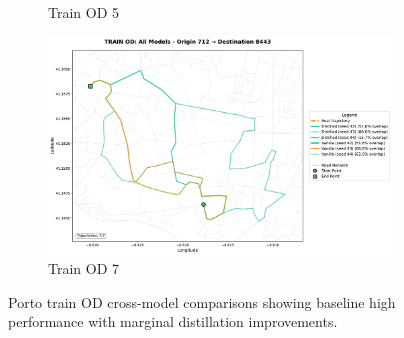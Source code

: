 \begin{figure}[H]
\begin{subfigure}{0.49\linewidth}
        \caption{Train OD 5}
    \end{subfigure}
    \begin{subfigure}{0.49\linewidth}
        \centering
        \includegraphics[width=\linewidth]{assets/plots/eval/porto/cross_model/train/train_od_comparison_7_origin712_dest8443.pdf}
        \caption{Train OD 7}
    \end{subfigure}
    \caption{Porto train OD cross-model comparisons showing baseline high performance with marginal distillation improvements.}
    \label{fig:appendix-porto-cross-train}
\end{figure}
